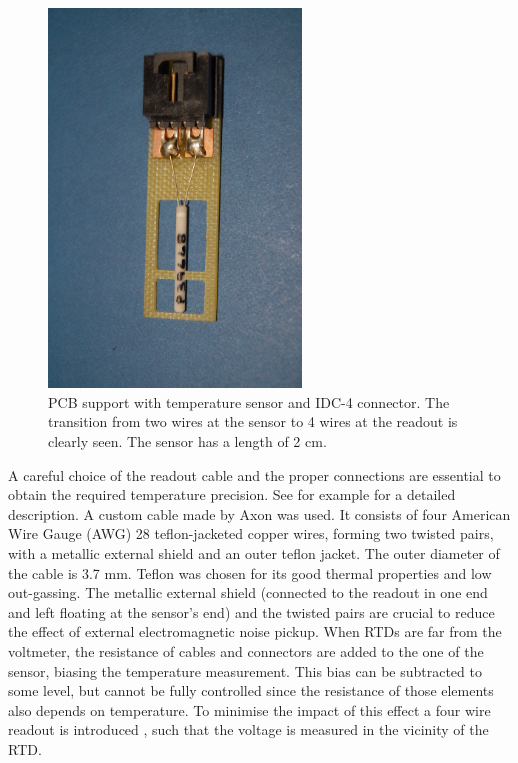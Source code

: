 \begin{figure}[htbp]
\begin{center}
\includegraphics[angle=-90, width=0.6\textwidth]{images/figure_1.jpg}%
\caption{PCB support with temperature sensor and IDC-4 connector. The transition from two wires at the sensor to 4 wires at the readout is clearly seen. The sensor has a length of 2 cm.
\label{fig:sensor}}
\end{center}
\end{figure}

A careful choice of the readout cable and the proper connections are essential to obtain the required temperature precision. See for example \cite{minco} for a detailed description. A custom cable made by Axon \cite{axon} was used. It consists of four American Wire Gauge (AWG) 28 teflon-jacketed copper wires, forming two twisted pairs, with a metallic external shield and an outer teflon jacket. The outer diameter of the cable is 3.7 mm. Teflon was chosen for its good thermal properties and low out-gassing. The metallic external shield (connected to the readout in one end and left floating at the sensor's end) and the twisted pairs are crucial to reduce the effect of external electromagnetic noise pickup. When RTDs are far from the voltmeter, the resistance of cables and connectors are added to the one of the sensor, biasing the temperature measurement. This bias can be subtracted to some level, but cannot be fully controlled since the resistance of those elements also depends on temperature. To minimise the impact of this effect a four wire readout is introduced \cite{minco}, such that the voltage is measured in the vicinity of the RTD.  

